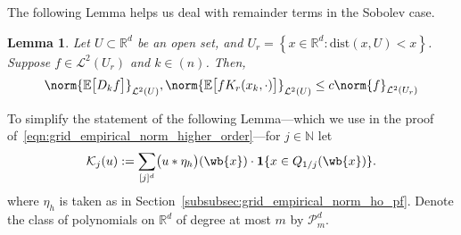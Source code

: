 \documentclass{article}
\newcommand{\Reals}{\mathbb{R}}
\newcommand{\set}[1]{\left\{#1\right\}}
\newcommand{\1}{\mathbf{1}}
\newcommand{\Rd}{\Reals^d}
\newcommand{\Leb}{\mathcal{L}}
\newcommand{\Ebb}{\mathbb{E}}
\theoremstyle{alden}
\theoremstyle{aldenthm}
\newtheorem{lemma}{Lemma}
\theoremstyle{definition}
\theoremstyle{remark}
\begin{document}
The following Lemma helps us deal with remainder terms in the Sobolev case.
\begin{lemma}
	\label{lem:remainder_term_sobolev}
	Let $U \subset \Rd$ be an open set, and $U_r = \set{x \in \Rd: \mathrm{dist}(x,U) < x}$. Suppose $f \in \Leb^2(U_r)$ and $k \in (n)$. Then,
	\begin{equation*}
	\norm{\Ebb\bigl[D_kf\bigr]}_{\Leb^2(U)}, \norm{\Ebb\bigl[fK_r(x_k,\cdot)\bigr]}_{\Leb^2(U)} \leq c \norm{f}_{\Leb^2(U_r)}
	\end{equation*}
\end{lemma}

To simplify the statement of the following Lemma---which we use in the proof of~\eqref{eqn:grid_empirical_norm_higher_order}---for $j \in \mathbb{N}$ let
\begin{equation*}
\mathcal{K}_j(u) := \sum_{[j]^d} \bigl(u \ast \eta_h\bigr)(\wb{x}) \cdot \1\{x \in Q_{1/j}(\wb{x})\}.
\end{equation*}
where $\eta_h$ is taken as in Section~\ref{subsubsec:grid_empirical_norm_ho_pf}. Denote the class of polynomials on $\Reals^d$ of degree at most $m$ by $\mathcal{P}_m^d$.
\end{document}
